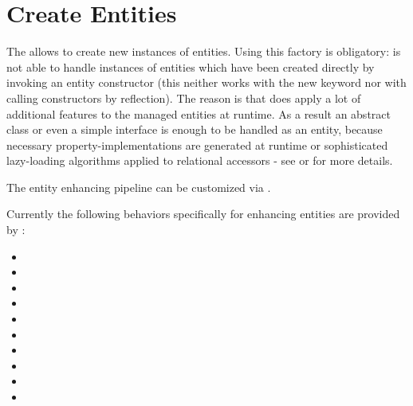 \section{Create Entities}
\label{feature:EntityFactory}
\ClearAPI
The  allows to create new instances of entities. Using this factory is obligatory: \AMBETH{} is not able to handle instances of entities which have been created directly by invoking an entity constructor (this neither works with the new keyword nor with calling constructors by reflection). The reason is that \AMBETH{} does apply a lot of additional features to the managed entities at runtime. As a result an abstract class or even a simple interface is enough to be handled as an \AMBETH{} entity, because necessary property-implementations are generated at runtime or sophisticated lazy-loading algorithms applied to relational accessors - see  or  for more details.

The entity enhancing pipeline can be customized via .

Currently the following behaviors specifically for enhancing entities are provided by \AMBETH{}:
\begin{itemize}
	\item {}
	\item {}
	\item {}
	\item {}
	\item {}
	\item {}
	\item {}
	\item {}
	\item {}
	\item {}
\end{itemize}


